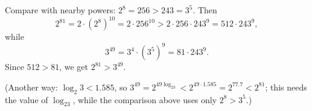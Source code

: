 Compare with nearby powers: $2^8=256>243=3^5$. Then
\[
2^{81}=2\cdot\left(2^8\right)^{10}=2\cdot256^{10}>2\cdot256\cdot243^{9}=512\cdot243^9,
\]
while
\[
3^{49}=3^4\cdot\left(3^5\right)^9=81\cdot243^9 .
\]
Since $512>81$, we get $\boxed{2^{81}>3^{49}}$.

(Another way: $\log_2 3<1.585$, so $3^{49}=2^{49\log_23}<2^{49\cdot1.585}=2^{77.7}<2^{81}$; this needs the value of $\log_23$, while the comparison above uses only $2^8>3^5$.)
